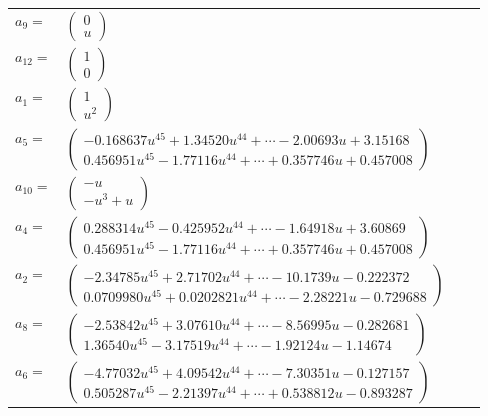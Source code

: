 \documentclass[1p]{elsarticle_modified}
\theoremstyle{definition}
\begin{document}
\begin{tabular}{m{7pt} m{180pt} m{7pt} m{180pt} }
\flushright $a_{9}=$&$\begin{pmatrix}0\\u\end{pmatrix}$ \\
\flushright $a_{12}=$&$\begin{pmatrix}1\\0\end{pmatrix}$ \\
\flushright $a_{1}=$&$\begin{pmatrix}1\\u^2\end{pmatrix}$ \\
\flushright $a_{5}=$&$\begin{pmatrix}-0.168637 u^{45}+1.34520 u^{44}+\cdots-2.00693 u+3.15168\\0.456951 u^{45}-1.77116 u^{44}+\cdots+0.357746 u+0.457008\end{pmatrix}$ \\
\flushright $a_{10}=$&$\begin{pmatrix}- u\\- u^3+u\end{pmatrix}$ \\
\flushright $a_{4}=$&$\begin{pmatrix}0.288314 u^{45}-0.425952 u^{44}+\cdots-1.64918 u+3.60869\\0.456951 u^{45}-1.77116 u^{44}+\cdots+0.357746 u+0.457008\end{pmatrix}$ \\
\flushright $a_{2}=$&$\begin{pmatrix}-2.34785 u^{45}+2.71702 u^{44}+\cdots-10.1739 u-0.222372\\0.0709980 u^{45}+0.0202821 u^{44}+\cdots-2.28221 u-0.729688\end{pmatrix}$ \\
\flushright $a_{8}=$&$\begin{pmatrix}-2.53842 u^{45}+3.07610 u^{44}+\cdots-8.56995 u-0.282681\\1.36540 u^{45}-3.17519 u^{44}+\cdots-1.92124 u-1.14674\end{pmatrix}$ \\
\flushright $a_{6}=$&$\begin{pmatrix}-4.77032 u^{45}+4.09542 u^{44}+\cdots-7.30351 u-0.127157\\0.505287 u^{45}-2.21397 u^{44}+\cdots+0.538812 u-0.893287\end{pmatrix}$ \\

\end{tabular}
\end{document}
